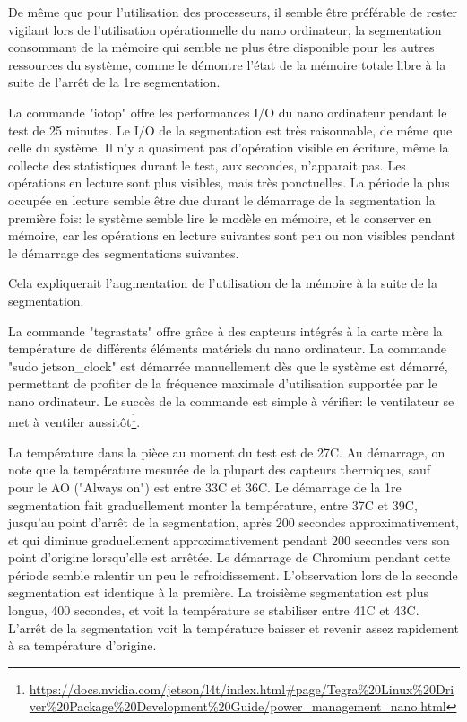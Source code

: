 \par De même que pour l'utilisation des processeurs, il semble être préférable de rester vigilant lors de l'utilisation opérationnelle du nano ordinateur, la segmentation consommant de la mémoire qui semble ne plus être disponible pour les autres ressources du système, comme le démontre l'état de la mémoire totale libre à la suite de l'arrêt de la 1re segmentation. 
\par La commande "iotop" offre les performances I/O du nano ordinateur pendant le test de 25 minutes. Le I/O de la segmentation est très raisonnable, de même que celle du système. Il n'y a quasiment pas d'opération visible en écriture, même la collecte des statistiques durant le test, aux secondes, n'apparait pas. Les opérations en lecture sont plus visibles, mais très ponctuelles. La période la plus occupée en lecture semble être due durant le démarrage de la segmentation la première fois: le système semble lire le modèle en mémoire, et le conserver en mémoire, car les opérations en lecture suivantes sont peu ou non visibles pendant le démarrage des segmentations suivantes.
\par Cela expliquerait l'augmentation de l'utilisation de la mémoire à la suite de la segmentation. 
\par La commande "tegrastats" offre grâce à des capteurs intégrés à la carte mère la température de différents éléments matériels du nano ordinateur. La commande "sudo jetson\_clock" est démarrée manuellement dès que le système est démarré, permettant de profiter de la fréquence maximale d'utilisation supportée par le nano ordinateur. Le  succès de la commande est simple à vérifier: le ventilateur se met à ventiler aussitôt\footnote{\url{https://docs.nvidia.com/jetson/l4t/index.html\#page/Tegra\%20Linux\%20Driver\%20Package\%20Development\%20Guide/power\_management\_nano.html}}.
\par La température dans la pièce au moment du test est de 27C. Au démarrage, on note que la température mesurée de la plupart des capteurs thermiques, sauf pour le AO ("Always on") est entre 33C et 36C. Le démarrage de la 1re segmentation fait graduellement monter la température, entre 37C et 39C, jusqu'au point d'arrêt de la segmentation, après 200 secondes approximativement, et qui diminue graduellement approximativement pendant 200 secondes vers son point d'origine lorsqu'elle est arrêtée. Le démarrage de Chromium pendant cette période semble ralentir un peu le refroidissement. L'observation lors de la seconde segmentation est identique à la première. La troisième segmentation est plus longue, 400 secondes, et voit la température se stabiliser entre 41C et 43C. L'arrêt de la segmentation voit la température baisser et revenir assez rapidement à sa température d'origine. 
